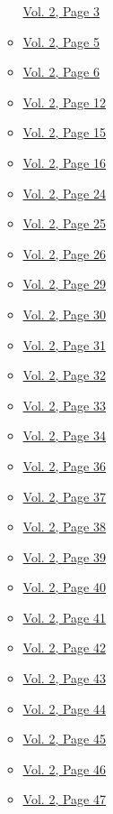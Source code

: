\begin{itemize}
\begin{itemize}
    \protect\hyperlink{g-page-215}{Vol. 2, Page 3}
  \item
    \protect\hyperlink{g-page-217}{Vol. 2, Page 5}
  \item
    \protect\hyperlink{g-page-218}{Vol. 2, Page 6}
  \item
    \protect\hyperlink{g-page-224}{Vol. 2, Page 12}
  \item
    \protect\hyperlink{g-page-227}{Vol. 2, Page 15}
  \item
    \protect\hyperlink{g-page-228}{Vol. 2, Page 16}
  \item
    \protect\hyperlink{g-page-236}{Vol. 2, Page 24}
  \item
    \protect\hyperlink{g-page-237}{Vol. 2, Page 25}
  \item
    \protect\hyperlink{g-page-238}{Vol. 2, Page 26}
  \item
    \protect\hyperlink{g-page-241}{Vol. 2, Page 29}
  \item
    \protect\hyperlink{g-page-242}{Vol. 2, Page 30}
  \item
    \protect\hyperlink{g-page-243}{Vol. 2, Page 31}
  \item
    \protect\hyperlink{g-page-244}{Vol. 2, Page 32}
  \item
    \protect\hyperlink{g-page-245}{Vol. 2, Page 33}
  \item
    \protect\hyperlink{g-page-246}{Vol. 2, Page 34}
  \item
    \protect\hyperlink{g-page-248}{Vol. 2, Page 36}
  \item
    \protect\hyperlink{g-page-249}{Vol. 2, Page 37}
  \item
    \protect\hyperlink{g-page-250}{Vol. 2, Page 38}
  \item
    \protect\hyperlink{g-page-251}{Vol. 2, Page 39}
  \item
    \protect\hyperlink{g-page-252}{Vol. 2, Page 40}
  \item
    \protect\hyperlink{g-page-253}{Vol. 2, Page 41}
  \item
    \protect\hyperlink{g-page-254}{Vol. 2, Page 42}
  \item
    \protect\hyperlink{g-page-255}{Vol. 2, Page 43}
  \item
    \protect\hyperlink{g-page-256}{Vol. 2, Page 44}
  \item
    \protect\hyperlink{g-page-257}{Vol. 2, Page 45}
  \item
    \protect\hyperlink{g-page-258}{Vol. 2, Page 46}
  \item
    \protect\hyperlink{g-page-259}{Vol. 2, Page 47}

\end{itemize}
\end{itemize}
